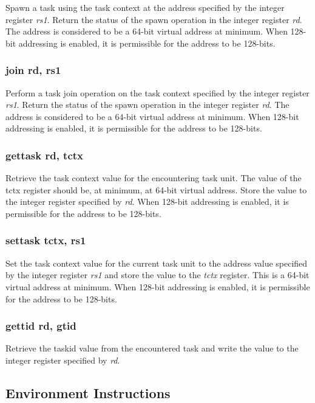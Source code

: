 \documentclass{article}
\begin{document}
Spawn a task using the task context at the address specified by the integer 
register \emph{rs1}.  Return the status of the spawn operation in the 
integer register \emph{rd}.  The address is considered to be a 64-bit virtual 
address at minimum.  When 128-bit addressing is enabled, it is permissible 
for the address to be 128-bits.  

\subsubsection{join rd, rs1}

Perform a task join operation on the task context specified 
by the integer register \emph{rs1}.  Return the status of the spawn operation
in the integer register \emph{rd}.  The address is considered to be a
64-bit virtual address at minimum.  When 128-bit addressing is enabled, it is
permissible for the address to be 128-bits. 

\subsubsection{gettask rd, tctx}

Retrieve the task context value for the encountering task unit.  
The value of the tctx register should be, at minimum, at 64-bit virtual
address.  Store the value to the integer register specified by \emph{rd}.  
When 128-bit addressing is enabled, it is permissible for the address to be 128-bits.

\subsubsection{settask tctx, rs1}

Set the task context value for the current task unit to the address value
specified by the integer register \emph{rs1} and store the value to the
\emph{tctx} register.  This is a 64-bit virtual address at minimum.  
When 128-bit addressing is enabled, it is permissible for the address to be 128-bits.


\subsubsection{gettid rd, gtid}

Retrieve the taskid value from the encountered task and write the value
to the integer register specified by \emph{rd}.

\subsection{Environment Instructions}
\end{document}
